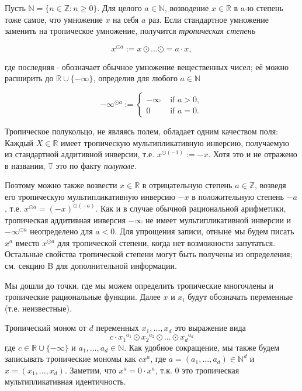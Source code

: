 \documentclass[russian]{lecture-notes}
\begin{document}
	Пусть $ \mathbb{N} = \{n \in \mathbb{Z} : n \geq 0\}$. Для целого $a \in \mathbb{N}$, возводение $x \in \mathbb{R}$ в a-ю степень тоже самое, что умножение $x$ на себя $a$ раз. Если стандартное умножение заменить на тропическое умножение, получится \textit{тропическая степень}
	
	\begin{equation*}
	x^{\odot a} := x \odot ... \odot = a \cdot x,
	\end{equation*}
	
	где последняя $\cdot$ обозначает обычное умножение вещественных чисел; её можно расширить до $\mathbb{R} \cup \{- \infty\}$, определив для любого $a \in \mathbb{N}$
	
	\begin{equation*}
	- \infty^{\odot a} := 
	\begin{cases}
	- \infty & \mbox{ if } a > 0, \\
	0 & \mbox{ if } a = 0.
	\end{cases}
	\end{equation*}
	
	Тропическое полукольцо, не являясь полем, обладает одним качеством поля: Каждый $X \in \mathbb{R}$ имеет тропическую мультипликативную инверсию, получаемую из стандартной аддитивной инверсии, т.е. $x^{\odot (-1)} := -x$. Хотя это и не отражено в названии, $\mathbb{T}$ это по факту \textit{полуполе}.
	
	Поэтому можно также возвести $x \in \mathbb{R}$ в отрицательную степень $a \in \mathbb{Z}$, возведя его тропическую мультипликативную инверсию $-x$ в положительную степень $-a$, т.е. $x^{\odot a} = (-x)^{\odot (-a)}$. Как и в случае обычной рациональной арифметики, тропическая аддитивная инверсия $- \infty$ не имеет мультипликативной инверсии и $- \infty^{\odot a}$ неопределено для $a < 0$. Для упрощения записи, отныне мы будем писать $x^a$ вместо $x^{\odot a}$ для тропической степени, когда нет возможности запутаться. Остальные свойства тропической степени могут быть получены из определения; см. секцию B для дополнительной информации.
	
	Мы дошли до точки, где мы можем определить тропические многочлены и тропические рациональные функции. Далее $x$ и $x_i$ будут обозначать переменные (т.е. неизвестные).
	
	\begin{Definition}
		Тропический моном от $d$ переменных $x_1,...,x_d$ это выражение вида
		\begin{equation*}
		c \cdot {x_1}^{a_1} \odot {x_2}^{a_2} \odot ... \odot {x_d}^{a_d}
		\end{equation*}
		где $c \in \mathbb{R} \cup \{- \infty\}$ и $a_1,...,a_d \in \mathbb{N}$. Как удобное сокращение, мы также будем записывать тропические мономы как $cx^a$, где $a = (a_1,...,a_d) \in \mathbb{N}^d$ и $x = (x_1,...,x_d)$. Заметим, что $x^a = 0 \cdot x^a$, т.к. 0 это тропическая мультипликативная идентичность.
	\end{Definition}
	
\end{document}
